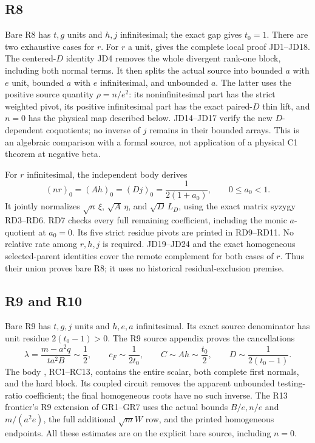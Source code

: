 \subsection{R8}

Bare R8 has \(t,g\) units and \(h,j\) infinitesimal;
the exact gap gives \(t_0=1\).
There are two exhaustive cases for \(r\).
For \(r\) a unit, 
gives the complete local proof JD1--JD18.
The centered-\(D\) identity JD4 removes the whole
divergent rank-one block, including both normal terms.
It then splits the actual source into bounded \(a\)
with \(e\) unit, bounded \(a\) with \(e\) infinitesimal,
and unbounded \(a\).
The latter uses the positive source quantity
\(\rho=n/e^2\): its noninfinitesimal part has the
strict weighted pivot, its positive infinitesimal
part has the exact paired-\(D\) thin lift, and
\(n=0\) has the physical map described below.
JD14--JD17 verify the new \(D\)-dependent coquotients;
no inverse of \(j\) remains in their bounded arrays.
This is an algebraic comparison with a formal source,
not application of a physical C1 theorem at negative beta.

For \(r\) infinitesimal, the independent body
 derives
\[
 (nr)_0=(Ah)_0=(Dj)_0=\frac1{2(1+a_0)},\qquad
 0\leq a_0<1 .
 \tag{BSR11}
\]
It jointly normalizes \(\sqrt n\,\xi\), \(\sqrt A\,\eta\),
and \(\sqrt D\,L_D\), using the exact matrix syzygy
RD3--RD6.  RD7 checks every full remaining coefficient,
including the monic \(a\)-quotient at \(a_0=0\).
Its five strict residue pivots are printed in RD9--RD11.
No relative rate among \(r,h,j\) is required.
JD19--JD24 and the exact homogeneous selected-parent
identities cover the remote complement for both cases
of \(r\).  Thus their union proves bare R8; it uses no
historical residual-exclusion premise.

\subsection{R9 and R10}

Bare R9 has \(t,g,j\) units and \(h,e,a\)
infinitesimal.  Its exact source denominator has unit
residue \(2(t_0-1)>0\).
The R9 source appendix proves the cancellations
\[
 \lambda=\frac{m-a^2q}{ta^2B}\sim\frac12,\qquad
 c_F\sim\frac1{2t_0},\qquad
 C\sim Ah\sim\frac{t_0}2,\qquad
 D\sim\frac1{2(t_0-1)}.
 \tag{BSR12}
\]
The body ,
RC1--RC13, contains the entire scalar, both complete
first normals, and the hard block.  Its coupled circuit
removes the apparent unbounded testing-ratio coefficient;
the final homogeneous roots have no such inverse.
The R13 frontier's R9 extension of GR1--GR7 uses
the actual bounds \(B/e,n/e\) and \(m/(a^2e)\),
the full additional \(\sqrt m W\) row, and the
printed homogeneous endpoints.
All these estimates are on the explicit bare source,
including \(n=0\).

